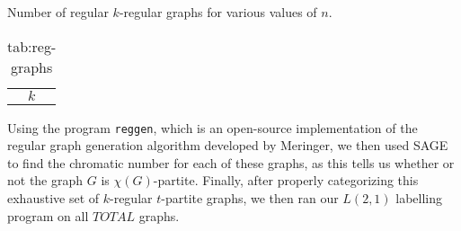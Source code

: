 \documentclass[12pt]{article}
\begin{document}
\begin{table}
\centering
\caption{Number of regular $k$-regular graphs for various values of $n$.}
\caption{tab:reg-graphs}

\begin{tabular}{|c|} \hline
$k$ \\
\end{tabular}

\end{table}

Using the program {\tt reggen}, which is an open-source implementation of the regular graph generation algorithm developed by Meringer, we then used SAGE to find the chromatic number for each of these graphs, as this tells us whether or not the graph $G$ is $\chi(G)$-partite. Finally, after properly categorizing this exhaustive set of $k$-regular $t$-partite graphs, we then ran our $L(2,1)$ labelling program on all $TOTAL$ graphs. 





\end{document}
